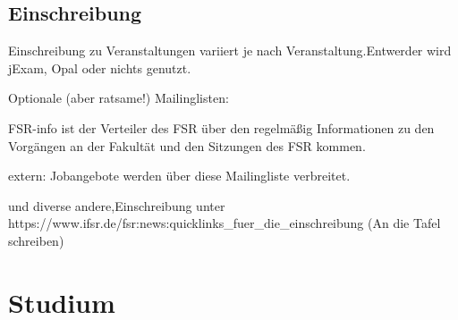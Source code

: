\documentclass[a4paper,12pt]{report}
\begin{document}
\subsection{Einschreibung}
\begin{itemize*}
	\item Einschreibung zu Veranstaltungen variiert je nach Veranstaltung.Entwerder wird jExam, Opal oder nichts genutzt.
	
	\item Optionale (aber ratsame!) Mailinglisten:
		\begin{itemize*}
		\item FSR-info ist der Verteiler des FSR über den regelmäßig Informationen zu den Vorgängen an der Fakultät und den Sitzungen des FSR kommen.
		\item extern: Jobangebote werden über diese Mailingliste verbreitet.
		\item und diverse andere,Einschreibung unter \\ https://www.ifsr.de/fsr:news:quicklinks\_fuer\_die\_einschreibung  (An die Tafel schreiben)
	\end{itemize*}
\end{itemize*}

\section{Studium}
\end{document}
